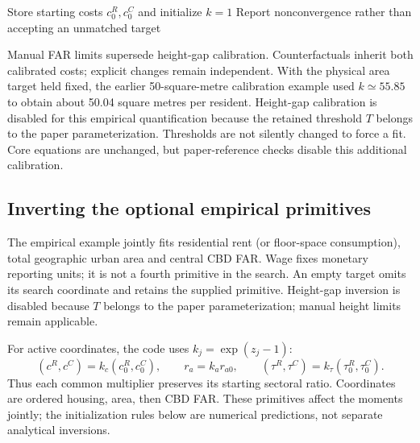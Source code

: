 \documentclass[11pt,a4paper]{article}
\begin{document}
\begin{algorithm2e}[H]
\caption{Match residential floor space: \texttt{MATCH\_FLOORSPACE}}
Store starting costs $c^R_0,c^C_0$ and initialize $k=1$\;
Report nonconvergence rather than accepting an unmatched target\;
\end{algorithm2e}

Manual FAR limits supersede height-gap calibration. Counterfactuals inherit both calibrated costs; explicit changes remain independent. With the physical area target held fixed, the earlier 50-square-metre calibration example used $k\simeq55.85$ to obtain about 50.04 square metres per resident. Height-gap calibration is disabled for this empirical quantification because the retained threshold $T$ belongs to the paper parameterization. Thresholds are not silently changed to force a fit. Core equations are unchanged, but paper-reference checks disable this additional calibration.


\clearpage
\subsection{Inverting the optional empirical primitives}\label{sec:optional_inversion}
The empirical example jointly fits residential rent (or floor-space consumption), total geographic urban area and central CBD FAR. Wage fixes monetary reporting units; it is not a fourth primitive in the search. An empty target omits its search coordinate and retains the supplied primitive. Height-gap inversion is disabled because $T$ belongs to the paper parameterization; manual height limits remain applicable.

For active coordinates, the code uses $k_j=\exp(z_j-1)$:
\begin{equation}
 (c^R,c^C)=k_c(c^R_0,c^C_0),\qquad
 r_a=k_a r_{a0},\qquad
 (\tau^R,\tau^C)=k_\tau(\tau^R_0,\tau^C_0).
\end{equation}
Thus each common multiplier preserves its starting sectoral ratio. Coordinates are ordered housing, area, then CBD FAR. These primitives affect the moments jointly; the initialization rules below are numerical predictions, not separate analytical inversions.
\end{document}
